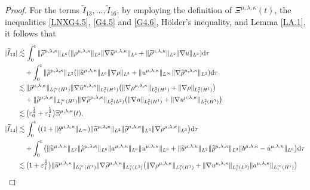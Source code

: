 \documentclass[reqno,11pt]{amsart}
\theoremstyle{plain}
\numberwithin{equation}{section}
\newcommand{\eps}{{\varepsilon}}
\begin{document}
\begin{proof}
For the terms $\widetilde{I}_{13}, \dots,  \widetilde{I}_{16}$, by employing the definition of ${\Xi} ^{\mu,\lambda,\kappa}(t)$, the inequalities  \eqref{LNXG4.5}, \eqref{G4.5} and \eqref{G4.6}, H\"{o}lder's inequality, and Lemma \ref{LA.1}, it follows that  
\begin{align}
|\widetilde{I}_{13}|\lesssim&\, \int_0^t\|\widetilde{\rho}^{\mu,\lambda,\kappa}\|_{L^6}(\| {\rho}^{\mu,\lambda,\kappa}\|_{L^2} \|\nabla\widetilde{u}^{{\mu,\lambda,\kappa}}\|_{L^3}+\| \widetilde{\rho}^{\mu,\lambda,\kappa}\|_{L^2}\|\nabla u\|_{L^3} ){\rm d}\tau\nonumber\\
&+\int_0^t\|\widetilde{\rho}^{{\mu,\lambda,\kappa}}\|_{L^2}(\|\widetilde{u}^{{\mu,\lambda,\kappa}}\|_{L^6}\|\nabla \rho\|_{L^3}+\|u^{{\mu,\lambda,\kappa}}\|_{L^{\infty}}\|\nabla\widetilde{\rho}^{{\mu,\lambda,\kappa}}\|_{L^2})   {\rm d}\tau \nonumber\\
\lesssim&\,\|\widetilde{\rho}^{{\mu,\lambda,\kappa}}\|_{L_t^{\infty}(H^1)}\|\nabla\widetilde{u}^{{\mu,\lambda,\kappa}}\|_{L_t^2(H^1)}\big(\|\nabla\rho^{\mu,\lambda,\kappa}\|_{L_t^{2}(H^1)} +\|\nabla\rho \|_{L_t^{2}(H^1)}\big)\nonumber\\
&+\|\widetilde{\rho}^{{\mu,\lambda,\kappa}}\|_{L_t^{\infty}(H^1)}\|\nabla\widetilde{\rho}^{\mu,\lambda,\kappa}\|_{L_t^2(L^2)}\big(\|\nabla u\|_{L_t^2(H^1)}+\|\nabla {u}^{\mu,\lambda,\kappa}\|_{L_t^2(H^1)}\big)\nonumber\\
\lesssim&\, \big(\eps_0^\frac{1}{2}+\eps_1^\frac{1}{2}\big){\Xi} ^{\mu,\lambda,\kappa}(t),\label{G4.13-1}\\
|\widetilde{I}_{14}|\lesssim&\,\int_0^t\big((1+\|\theta^{\mu,\lambda,\kappa}\|_{L^\infty})\|\widetilde{u}^{\mu,\lambda,\kappa}\|_{L^2}\|\widetilde{\rho}^{\mu,\lambda,\kappa}\|_{L^6}\|\nabla\rho^{\mu,\lambda,\kappa}\|_{L^3}\big){\rm d}\tau\nonumber\\
&+\int_{0}^t\big(\|\widetilde{u}^{\mu,\lambda,\kappa}\|_{L^2}\|\widetilde{\rho}^{\mu,\lambda,\kappa}\|_{L^6}\|a^{\mu,\lambda,\kappa}\|_{L^6}\|u^{\mu,\lambda,\kappa}\|_{L^6}+\|\widetilde{u}^{\mu,\lambda,\kappa}\|_{L^2}\|\widetilde{\rho}^{\mu,\lambda,\kappa}\|_{L^3}\|b^{\mu,\lambda,\kappa}-u^{\mu,\lambda,\kappa}\|_{L^6}\big){\rm d}\tau\nonumber\\
\lesssim&\, \big(1+\eps_1^\frac{1}{2}\big)\|\widetilde{u}^{{\mu,\lambda,\kappa}}\|_{L_t^{\infty}(H^1)}\|\nabla\widetilde{\rho}^{{\mu,\lambda,\kappa}}\|_{L_t^{2}(L^2)}\big(\|\nabla {\rho}^{{\mu,\lambda,\kappa}}\|_{L_t^{2}(H^1)}+\|\nabla u^{\mu,\lambda,\kappa}\|_{L_t^2(L^2)}\|a^{\mu,\lambda,\kappa}\|_{L_t^\infty(H^1)}\big)\nonumber\\

\end{align}
\end{proof}
\end{document}
